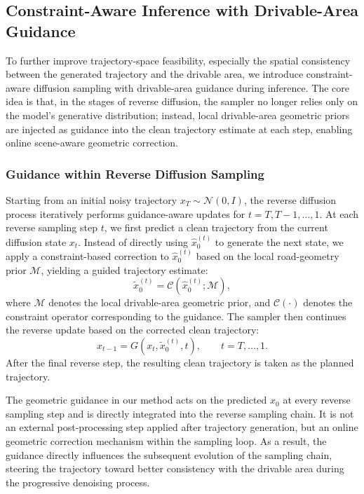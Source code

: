 \documentclass[3p,times,authoryear]{elsarticle}
\begin{document}
\subsection{Constraint-Aware Inference with Drivable-Area Guidance}

To further improve trajectory-space feasibility, especially the spatial consistency between the generated trajectory and the drivable area, we introduce constraint-aware diffusion sampling with drivable-area guidance during inference. The core idea is that, in the stages of reverse diffusion, the sampler no longer relies only on the model’s generative distribution; instead, local drivable-area geometric priors are injected as guidance into the clean trajectory estimate at each step, enabling online scene-aware geometric correction.

\subsubsection{Guidance within Reverse Diffusion Sampling}

Starting from an initial noisy trajectory \(x_T \sim \mathcal{N}(0,I)\), the reverse diffusion process iteratively performs guidance-aware updates for \(t=T,T-1,\dots,1\). At each reverse sampling step \(t\), we first predict a clean trajectory from the current diffusion state \(x_t\). Instead of directly using \(\hat{x}_0^{(t)}\) to generate the next state, we apply a constraint-based correction to \(\hat{x}_0^{(t)}\) based on the local road-geometry prior \(\mathcal{M}\), yielding a guided trajectory estimate:
\begin{equation}
\tilde{x}_0^{(t)} = \mathcal{C}\!\left(\hat{x}_0^{(t)}; \mathcal{M}\right),
\end{equation}
where \(\mathcal{M}\) denotes the local drivable-area geometric prior, and \(\mathcal{C}(\cdot)\) denotes the constraint operator corresponding to the guidance. The sampler then continues the reverse update based on the corrected clean trajectory:
\begin{equation}
x_{t-1} = G\!\left(x_t, \tilde{x}_0^{(t)}, t\right), \qquad t=T,\dots,1.
\end{equation}
After the final reverse step, the resulting clean trajectory is taken as the planned trajectory.

The geometric guidance in our method acts on the predicted $x_0$ at every reverse sampling step and is directly integrated into the reverse sampling chain. It is not an external post-processing step applied after trajectory generation, but an online geometric correction mechanism within the sampling loop. As a result, the guidance directly influences the subsequent evolution of the sampling chain, steering the trajectory toward better consistency with the drivable area during the progressive denoising process.
\end{document}
